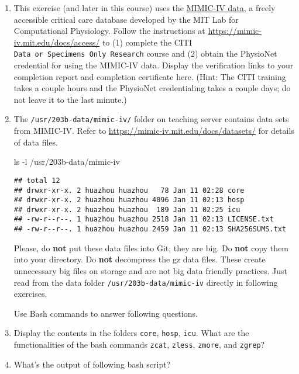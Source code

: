 \documentclass[
]{article}
\newenvironment{Shaded}{\begin{snugshade}}{\end{snugshade}}
\newcommand{\FunctionTok}[1]{\textcolor[rgb]{0.00,0.00,0.00}{#1}}
\newcommand{\NormalTok}[1]{#1}
\begin{document}
\begin{enumerate}
\def\labelenumi{\arabic{enumi}.}
\item
  This exercise (and later in this course) uses the
  \href{https://mimic-iv.mit.edu}{MIMIC-IV data}, a freely accessible
  critical care database developed by the MIT Lab for Computational
  Physiology. Follow the instructions at
  \url{https://mimic-iv.mit.edu/docs/access/} to (1) complete the CITI
  \texttt{Data\ or\ Specimens\ Only\ Research} course and (2) obtain the
  PhysioNet credential for using the MIMIC-IV data. Display the
  verification links to your completion report and completion
  certificate here. (Hint: The CITI training takes a couple hours and
  the PhysioNet credentialing takes a couple days; do not leave it to
  the last minute.)
\item
  The \texttt{/usr/203b-data/mimic-iv/} folder on teaching server
  contains data sets from MIMIC-IV. Refer to
  \url{https://mimic-iv.mit.edu/docs/datasets/} for details of data
  files.

\begin{Shaded}
\begin{Highlighting}[]
\FunctionTok{ls}\NormalTok{ -l /usr/203b-data/mimic-iv}
\end{Highlighting}
\end{Shaded}

\begin{verbatim}
## total 12
## drwxr-xr-x. 2 huazhou huazhou   78 Jan 11 02:28 core
## drwxr-xr-x. 2 huazhou huazhou 4096 Jan 11 02:13 hosp
## drwxr-xr-x. 2 huazhou huazhou  189 Jan 11 02:25 icu
## -rw-r--r--. 1 huazhou huazhou 2518 Jan 11 02:13 LICENSE.txt
## -rw-r--r--. 1 huazhou huazhou 2459 Jan 11 02:13 SHA256SUMS.txt
\end{verbatim}

  Please, do \textbf{not} put these data files into Git; they are big.
  Do \textbf{not} copy them into your directory. Do \textbf{not}
  decompress the gz data files. These create unnecessary big files on
  storage and are not big data friendly practices. Just read from the
  data folder \texttt{/usr/203b-data/mimic-iv} directly in following
  exercises.

  Use Bash commands to answer following questions.
\item
  Display the contents in the folders \texttt{core}, \texttt{hosp},
  \texttt{icu}. What are the functionalities of the bash commands
  \texttt{zcat}, \texttt{zless}, \texttt{zmore}, and \texttt{zgrep}?
\item
  What's the output of following bash script?


\end{enumerate}
\end{document}
